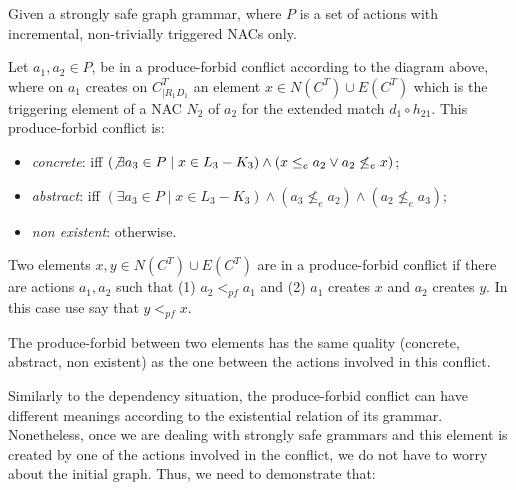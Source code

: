\begin{definition}\label{def:produce-forbid-strong} Given \doublyTypedGraphGrammarCore{} a strongly safe graph grammar, where $P$ is a set of actions with incremental, non-trivially triggered NACs only.

\hfill

  Let $a_1,a_2 \in P$, be in a produce-forbid conflict according to the diagram above, where on $a_1$ creates on $C^T_{|R_1D_1}$ an element $x \in N(C^T) \cup E(C^T)$ which is the triggering element of a NAC $N_2$ of $a_2$ for the extended match $d_1 \circ h_{21}$. This produce-forbid conflict is:

\begin{itemize}
  \item \emph{concrete}: iff $(\not\exists a_3 \in P \mid x \in L_3 - K_3) \land (x \leq_e a_2 \lor a_2 \not\leq_e x)$; %
  \item \emph{abstract}: iff $(\exists a_3 \in P \mid x \in L_3 - K_3) \land (a_3 \not\leq_e a_2) \land (a_2 \not\leq_e a_3)$;
  \item \emph{non existent}: otherwise.
\end{itemize}

  Two elements $x, y \in N(C^T) \cup E(C^T)$ are in a produce-forbid conflict if there are actions $a_1,a_2$ such that (1) $a_2 <_{pf} a_1$ and (2) $a_1$ creates $x$ and $a_2$ creates $y$. In this case use say that $y <_{pf} x$.

  The produce-forbid between two elements has the same quality (concrete, abstract, non existent) as the one between the actions involved in this conflict.
\end{definition}

  Similarly to the dependency situation, the produce-forbid conflict can have different meanings according to the existential relation of its grammar. Nonetheless, once we are dealing with strongly safe grammars and this element is created by one of the actions involved in the conflict, we do not have to worry about the initial graph. Thus, we need to demonstrate that:

